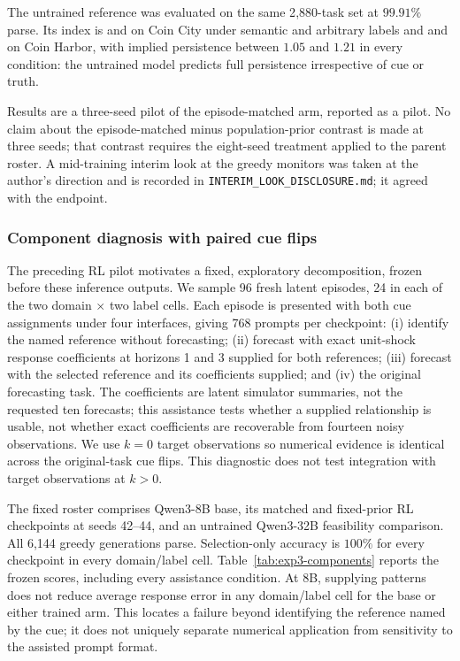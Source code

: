 The untrained reference was evaluated on the same 2{,}880-task set at $99.91\%$
parse. Its index is \eSelCitySemBase{} and \eSelCityArbBase{} on Coin City under
semantic and arbitrary labels and \eSelHarborSemBase{} and \eSelHarborArbBase{}
on Coin Harbor, with implied persistence between $1.05$ and $1.21$ in every
condition: the untrained model predicts full persistence irrespective of cue or
truth.

Results are a three-seed pilot of the episode-matched arm, reported as a pilot.
No claim about the episode-matched minus population-prior contrast is made at
three seeds; that contrast requires the eight-seed treatment applied to the
parent roster. A mid-training interim look at the greedy monitors was taken at
the author's direction and is recorded in
\texttt{INTERIM\_LOOK\_DISCLOSURE.md}; it agreed with the endpoint.



\subsubsection{Component diagnosis with paired cue flips}
\label{app:exp3-components}

The preceding RL pilot motivates a fixed, exploratory decomposition, frozen
before these inference outputs. We sample 96 fresh latent episodes, 24 in each
of the two domain $\times$ two label cells. Each episode is presented with both
cue assignments under four interfaces, giving 768 prompts per checkpoint:
(i) identify the named reference without forecasting; (ii) forecast with exact
unit-shock response coefficients at horizons 1 and 3 supplied for both
references; (iii) forecast with the selected reference and its coefficients
supplied; and (iv) the original forecasting task. The coefficients are latent
simulator summaries, not the requested ten forecasts; this assistance tests
whether a supplied relationship is usable, not whether exact coefficients are
recoverable from fourteen noisy observations. We use $k=0$ target observations
so numerical evidence is identical across the original-task cue flips. This
diagnostic does not test integration with target observations at $k>0$.

The fixed roster comprises Qwen3-8B base, its matched and fixed-prior RL
checkpoints at seeds 42--44, and an untrained Qwen3-32B feasibility comparison.
All 6,144 greedy generations parse. Selection-only accuracy is $100\%$ for
every checkpoint in every domain/label cell. Table~\ref{tab:exp3-components}
reports the frozen scores, including every assistance condition. At 8B,
supplying patterns does not reduce average response error in any domain/label
cell for the base or either trained arm. This locates a failure beyond
identifying the reference named by the cue; it does not uniquely separate
numerical application from sensitivity to the assisted prompt format.

